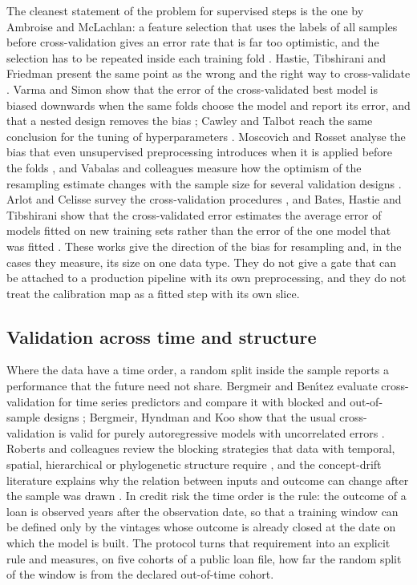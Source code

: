 The cleanest statement of the problem for supervised steps is the one by Ambroise and McLachlan: a feature selection that uses the labels of all samples before cross-validation gives an error rate that is far too optimistic, and the selection has to be repeated inside each training fold \citep{ambroise2002}. Hastie, Tibshirani and Friedman present the same point as the wrong and the right way to cross-validate \citep{hastie2009}. Varma and Simon show that the error of the cross-validated best model is biased downwards when the same folds choose the model and report its error, and that a nested design removes the bias \citep{varma2006}; Cawley and Talbot reach the same conclusion for the tuning of hyperparameters \citep{cawley2010}. Moscovich and Rosset analyse the bias that even unsupervised preprocessing introduces when it is applied before the folds \citep{moscovich2022}, and Vabalas and colleagues measure how the optimism of the resampling estimate changes with the sample size for several validation designs \citep{vabalas2019}. Arlot and Celisse survey the cross-validation procedures \citep{arlot2010}, and Bates, Hastie and Tibshirani show that the cross-validated error estimates the average error of models fitted on new training sets rather than the error of the one model that was fitted \citep{bates2023}. These works give the direction of the bias for resampling and, in the cases they measure, its size on one data type. They do not give a gate that can be attached to a production pipeline with its own preprocessing, and they do not treat the calibration map as a fitted step with its own slice.

\subsection{Validation across time and structure}

Where the data have a time order, a random split inside the sample reports a performance that the future need not share. Bergmeir and Ben\'{\i}tez evaluate cross-validation for time series predictors and compare it with blocked and out-of-sample designs \citep{bergmeir2012}; Bergmeir, Hyndman and Koo show that the usual cross-validation is valid for purely autoregressive models with uncorrelated errors \citep{bergmeir2018}. Roberts and colleagues review the blocking strategies that data with temporal, spatial, hierarchical or phylogenetic structure require \citep{roberts2017}, and the concept-drift literature explains why the relation between inputs and outcome can change after the sample was drawn \citep{gama2014}. In credit risk the time order is the rule: the outcome of a loan is observed years after the observation date, so that a training window can be defined only by the vintages whose outcome is already closed at the date on which the model is built. The protocol turns that requirement into an explicit rule and measures, on five cohorts of a public loan file, how far the random split of the window is from the declared out-of-time cohort.

